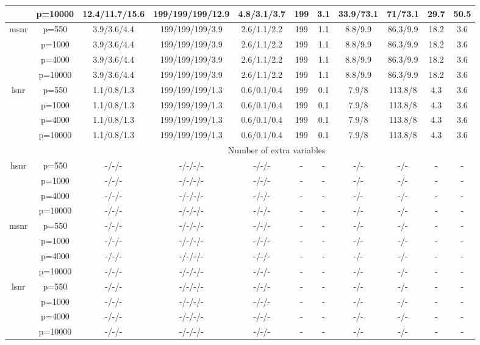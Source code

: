 \begin{table}[ht]
{\begin{tabular}{|c|c|ccccccccc|}
   & p=10000 & 12.4/11.7/15.6 & 199/199/199/12.9 & 4.8/3.1/3.7 & 199 & 3.1 & 33.9/73.1 & 71/73.1 & 29.7 & 50.5 \\ 
  \midrule\multirow{4}[2]{*}{msnr} & p=550 & 3.9/3.6/4.4 & 199/199/199/3.9 & 2.6/1.1/2.2 & 199 & 1.1 & 8.8/9.9 & 86.3/9.9 & 18.2 & 3.6 \\ 
   & p=1000 & 3.9/3.6/4.4 & 199/199/199/3.9 & 2.6/1.1/2.2 & 199 & 1.1 & 8.8/9.9 & 86.3/9.9 & 18.2 & 3.6 \\ 
   & p=4000 & 3.9/3.6/4.4 & 199/199/199/3.9 & 2.6/1.1/2.2 & 199 & 1.1 & 8.8/9.9 & 86.3/9.9 & 18.2 & 3.6 \\ 
   & p=10000 & 3.9/3.6/4.4 & 199/199/199/3.9 & 2.6/1.1/2.2 & 199 & 1.1 & 8.8/9.9 & 86.3/9.9 & 18.2 & 3.6 \\ 
  \midrule\multirow{4}[2]{*}{lsnr} & p=550 & 1.1/0.8/1.3 & 199/199/199/1.3 & 0.6/0.1/0.4 & 199 & 0.1 & 7.9/8 & 113.8/8 & 4.3 & 3.6 \\ 
   & p=1000 & 1.1/0.8/1.3 & 199/199/199/1.3 & 0.6/0.1/0.4 & 199 & 0.1 & 7.9/8 & 113.8/8 & 4.3 & 3.6 \\ 
   & p=4000 & 1.1/0.8/1.3 & 199/199/199/1.3 & 0.6/0.1/0.4 & 199 & 0.1 & 7.9/8 & 113.8/8 & 4.3 & 3.6 \\ 
   & p=10000 & 1.1/0.8/1.3 & 199/199/199/1.3 & 0.6/0.1/0.4 & 199 & 0.1 & 7.9/8 & 113.8/8 & 4.3 & 3.6 \\ 
   \midrule 
 \multicolumn{1}{|c}{} &       & \multicolumn{9}{c|}{Number of extra variables} \\
\midrule\multirow{4}[2]{*}{hsnr} & p=550 & -/-/- & -/-/-/- & -/-/- & - & - & -/- & -/- & - & - \\ 
   & p=1000 & -/-/- & -/-/-/- & -/-/- & - & - & -/- & -/- & - & - \\ 
   & p=4000 & -/-/- & -/-/-/- & -/-/- & - & - & -/- & -/- & - & - \\ 
   & p=10000 & -/-/- & -/-/-/- & -/-/- & - & - & -/- & -/- & - & - \\ 
  \midrule\multirow{4}[2]{*}{msnr} & p=550 & -/-/- & -/-/-/- & -/-/- & - & - & -/- & -/- & - & - \\ 
   & p=1000 & -/-/- & -/-/-/- & -/-/- & - & - & -/- & -/- & - & - \\ 
   & p=4000 & -/-/- & -/-/-/- & -/-/- & - & - & -/- & -/- & - & - \\ 
   & p=10000 & -/-/- & -/-/-/- & -/-/- & - & - & -/- & -/- & - & - \\ 
  \midrule\multirow{4}[2]{*}{lsnr} & p=550 & -/-/- & -/-/-/- & -/-/- & - & - & -/- & -/- & - & - \\ 
   & p=1000 & -/-/- & -/-/-/- & -/-/- & - & - & -/- & -/- & - & - \\ 
   & p=4000 & -/-/- & -/-/-/- & -/-/- & - & - & -/- & -/- & - & - \\ 
   & p=10000 & -/-/- & -/-/-/- & -/-/- & - & - & -/- & -/- & - & - \\ 
   \bottomrule 
\end{tabular}
}
\end{table}
